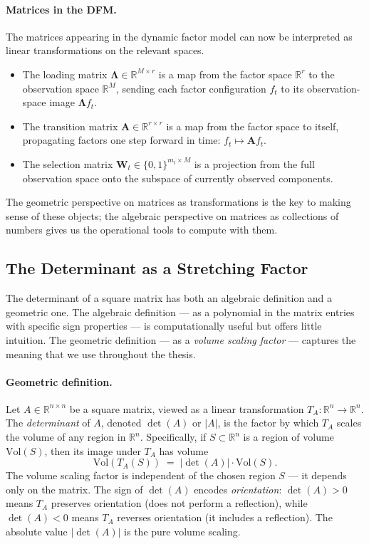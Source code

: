 \documentclass[11pt, a4paper, oneside]{article}
\newcommand{\mL}{\boldsymbol{\Lambda}}
\begin{document}
\paragraph{Matrices in the DFM.}
The matrices appearing in the dynamic factor model can now be
interpreted as linear transformations on the relevant spaces.
\begin{itemize}[leftmargin=1.5em, itemsep=2pt]
    \item The loading matrix $\mL \in \mathbb{R}^{M \times r}$ is a
          map from the factor space $\mathbb{R}^r$ to the observation
          space $\mathbb{R}^M$, sending each factor configuration
          $f_t$ to its observation-space image $\mL f_t$.
    \item The transition matrix $\mathbf{A} \in \mathbb{R}^{r \times r}$
          is a map from the factor space to itself, propagating
          factors one step forward in time:
          $f_t \mapsto \mathbf{A} f_t$.
    \item The selection matrix $\mathbf{W}_t \in \{0,1\}^{m_t \times M}$
          is a projection from the full observation space onto the
          subspace of currently observed components.
\end{itemize}
The geometric perspective on matrices as transformations is the key
to making sense of these objects; the algebraic perspective on
matrices as collections of numbers gives us the operational tools to
compute with them.

\subsection{The Determinant as a Stretching Factor}
\label{sec:appendix-determinant}

The determinant of a square matrix has both an algebraic definition
and a geometric one. The algebraic definition — as a polynomial in
the matrix entries with specific sign properties — is computationally
useful but offers little intuition. The geometric definition — as a
\emph{volume scaling factor} — captures the meaning that we use
throughout the thesis.

\paragraph{Geometric definition.}
Let $A \in \mathbb{R}^{n \times n}$ be a square matrix, viewed as a
linear transformation $T_A: \mathbb{R}^n \to \mathbb{R}^n$. The
\emph{determinant} of $A$, denoted $\det(A)$ or $|A|$, is the factor
by which $T_A$ scales the volume of any region in $\mathbb{R}^n$.
Specifically, if $S \subset \mathbb{R}^n$ is a region of volume
$\mathrm{Vol}(S)$, then its image under $T_A$ has volume
\[
\mathrm{Vol}(T_A(S)) \;=\; |\det(A)| \cdot \mathrm{Vol}(S).
\]
The volume scaling factor is independent of the chosen region $S$ —
it depends only on the matrix. The sign of $\det(A)$ encodes
\emph{orientation}: $\det(A) > 0$ means $T_A$ preserves orientation
(does not perform a reflection), while $\det(A) < 0$ means $T_A$
reverses orientation (it includes a reflection). The absolute value
$|\det(A)|$ is the pure volume scaling.
\end{document}
